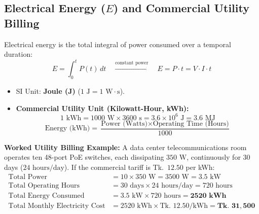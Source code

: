 \subsection{Electrical Energy ($E$) and Commercial Utility Billing}
Electrical energy is the total integral of power consumed over a temporal duration:
\begin{equation}
\label{eq:energy_def}
E = \int_{0}^{t} P(t)\,dt \quad \xrightarrow{\text{constant power}} \quad \boxed{E = P \cdot t = V \cdot I \cdot t}
\end{equation}
\begin{itemize}
    \item SI Unit: \textbf{Joule (J)} ($1\text{ J} = 1\text{ W}\cdot\text{s}$).
    \item \textbf{Commercial Utility Unit (Kilowatt-Hour, kWh):}
    \begin{equation}
    \label{eq:kwh_def}
    1\text{ kWh} = 1000\text{ W} \times 3600\text{ s} = 3.6 \times 10^6\text{ J} = 3.6\text{ MJ}
    \end{equation}
    \begin{equation}
    \label{eq:energy_kwh_formula}
    \text{Energy (kWh)} = \frac{\text{Power (Watts)} \times \text{Operating Time (Hours)}}{1000}
    \end{equation}
\end{itemize}

\textbf{Worked Utility Billing Example:} A data center telecommunications room operates ten 48-port PoE switches, each dissipating $350\text{ W}$, continuously for 30 days ($24\text{ hours/day}$). If the commercial tariff is Tk.~$12.50$ per kWh:
\begin{align*}
\text{Total Power} &= 10 \times 350\text{ W} = 3500\text{ W} = 3.5\text{ kW} \\
\text{Total Operating Hours} &= 30\text{ days} \times 24\text{ hours/day} = 720\text{ hours} \\
\text{Total Energy Consumed} &= 3.5\text{ kW} \times 720\text{ hours} = \mathbf{2520\text{ kWh}} \\
\text{Total Monthly Electricity Cost} &= 2520\text{ kWh} \times \text{Tk. } 12.50/\text{kWh} = \mathbf{\text{Tk. } 31,500}
\end{align*}

